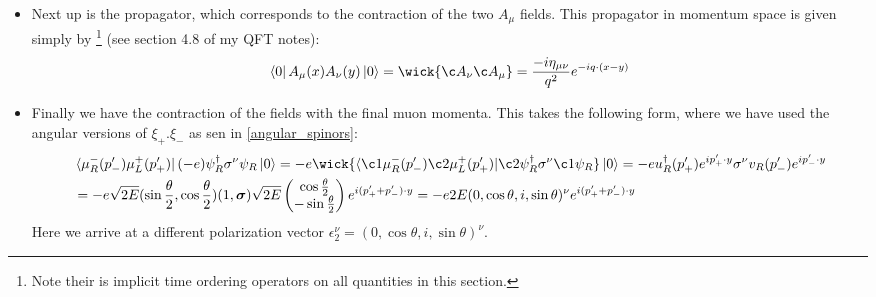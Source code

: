 \documentclass[11pt]{article}
\numberwithin{equation}{section}
\begin{document}
\begin{itemize}
    \item Next up is the propagator, which corresponds to the contraction of the two $A_{\mu}$ fields. This propagator in momentum space is given simply by \footnote{Note their is implicit time ordering operators on all quantities in this section. } (see section 4.8 of my QFT notes):
    \begin{align*}
       \bra{0} A_{\mu}(x) A_{\nu}(y)\ket{0}=\wick{\c A_{\nu}\c A_{\mu}} = \frac{-i\eta_{\mu\nu}}{q^2}e^{-iq \cdot (x - y)}
     \end{align*}
     \item Finally we have the contraction of the fields with the final muon momenta. This takes the following form, where we have used the angular versions of $\xi_+.\xi_-$ as sen in \ref{angular_spinors}:  
     \begin{align*}
         &\bra{\mu_R^{-}(p_-')\mu_L^{+}(p_+')}(- e)\psi^{\dagger}_R\sigma^{\nu}\psi_R \ket{0}=-e \wick{  \langle \c1\mu_R^{-}(p_-')\c2 \mu_L^{+}(p_+')| \c2 \psi^{\dagger}_R\sigma^{\nu}\c1 \psi_R}\ket{0} = -eu^{\dagger}_R(p_+')e^{ip_{+}'\cdot y}\sigma^{\nu}v_R(p_-')e^{ip_-'\cdot y} \\
         & = -e \sqrt{2E}(\sin \frac{\theta}{2} , \cos \frac{\theta}{2}) (1,\boldsymbol{\sigma})\sqrt{2E}\begin{pmatrix}
             \cos \frac{\theta}{2} \\ -\sin \frac{\theta}{2}
         \end{pmatrix} e^{i(p_+'+p_-')\cdot y} = -e2E( 0, \cos \theta, i, \sin \theta)^{\nu}e^{i(p_+'+p_-')\cdot y}
     \end{align*}
     Here we arrive at a different polarization vector $\epsilon_2^{\nu} = ( 0, \cos \theta, i, \sin \theta)^{\nu}$. 


\end{itemize}
\end{document}
